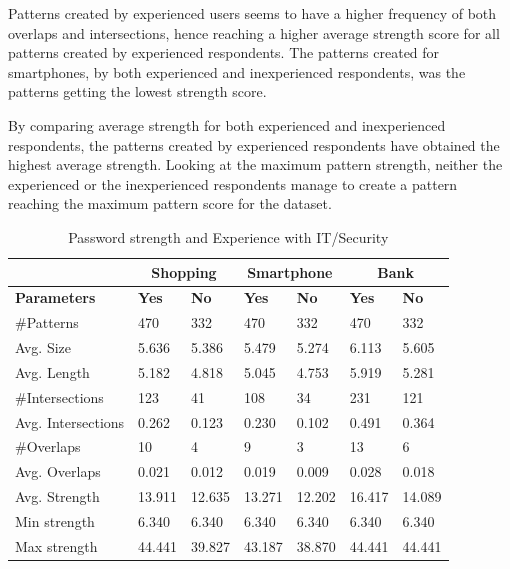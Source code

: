     Patterns created by experienced users seems to have a higher frequency of both overlaps and intersections, hence reaching a higher average strength score for all patterns created by experienced respondents. The patterns created for smartphones, by both experienced and inexperienced respondents, was the patterns getting the lowest strength score. 

    By comparing average strength for both experienced and inexperienced respondents, the patterns created by experienced respondents have obtained the highest average strength. Looking at the maximum pattern strength, neither the experienced or the inexperienced respondents manage to create a pattern reaching the maximum pattern score for the dataset.

      \begin{table}[H]
        \centering
        \begin{tabular}{l || l | l || l | l || l | l }
          \hline
           & \multicolumn{2}{c||}{\bf Shopping} & \multicolumn{2}{c||}{\bf Smartphone} &\multicolumn{2}{c}{\bf Bank} \\ \hline
          {\bf Parameters}   & {\bf Yes} & {\bf No} & {\bf Yes} & {\bf No} & {\bf Yes} & {\bf No}\\ \hline
          \#Patterns         & 470    & 332    & 470    & 332    & 470    & 332    \\
          Avg. Size          & 5.636  & 5.386  & 5.479  & 5.274  & 6.113  & 5.605  \\
          Avg. Length        & 5.182  & 4.818  & 5.045  & 4.753  & 5.919  & 5.281  \\
          \#Intersections    & 123    & 41     & 108    & 34     & 231    & 121    \\
          Avg. Intersections & 0.262  & 0.123  & 0.230  & 0.102  & 0.491  & 0.364  \\
          \#Overlaps         & 10     & 4      & 9      & 3      & 13     & 6      \\
          Avg. Overlaps      & 0.021  & 0.012  & 0.019  & 0.009  & 0.028  & 0.018  \\ \hline
          Avg. Strength      & 13.911 & 12.635 & 13.271 & 12.202 & 16.417 & 14.089 \\ 
          Min strength       & 6.340  & 6.340  & 6.340  & 6.340  & 6.340  & 6.340  \\
          Max strength       & 44.441 & 39.827 & 43.187 & 38.870 & 44.441 & 44.441 \\ \hline
        \end{tabular}
        \caption{Password strength and Experience with IT/Security}
        \label{tab:experiencestrength} 
      \end{table} 

